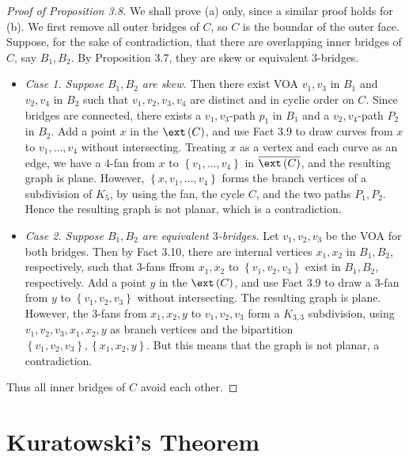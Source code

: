 \documentclass[co342]{subfiles}
\begin{document}
    \begin{proof}[Proof of Proposition 3.8]
        We shall prove (a) only, since a similar proof holds for (b). We first remove all outer bridges of $C$, so $C$ is the boundar of the outer face. Suppose, for the sake of contradiction, that there are overlapping inner bridges of $C$, say $B_1,B_2$. By Proposition 3.7, they are skew or equivalent $3$-bridges.
        \begin{itemize}
            \item \textit{Case 1. Suppose $B_1,B_2$ are skew.} Then there exist VOA $v_1,v_3$ in $B_1$ and $v_2,v_4$ in $B_2$ such that $v_1,v_2,v_3,v_4$ are distinct and in cyclic order on $C$. Since bridges are connected, there exists a $v_1,v_3$-path $p_1$ in $B_1$ and a $v_2,v_4$-path $P_2$ in $B_2$. Add a point $x$ in the $\ext\left( C \right)$, and use Fact 3.9 to draw curves from $x$ to $v_1,\ldots,v_4$ without intersecting. Treating $x$ as a vertex and each curve as an edge, we have a $4$-fan from $x$ to $\left\lbrace v_1,\ldots,v_4 \right\rbrace$ in $\overline{\ext\left( C \right)}$, and the resulting graph is plane. However, $\left\lbrace x,v_1,\ldots,v_4 \right\rbrace$ forms the branch vertices of a subdivision of $K_5$, by using the fan, the cycle $C$, and the two paths $P_1,P_2$. Hence the resulting graph is not planar, which is a contradiction. 
            \item \textit{Case 2. Suppose $B_1,B_2$ are equivalent $3$-bridges.} Let $v_1,v_2,v_3$ be the VOA for both bridges. Then by Fact 3.10, there are internal vertices $x_1,x_2$ in $B_1,B_2$, respectively, such that $3$-fans ffrom $x_1,x_2$ to $\left\lbrace v_1,v_2,v_3 \right\rbrace$ exist in $B_1,B_2$, respectively. Add a point $y$ in the $\ext\left( C \right)$, and use Fact 3.9 to draw a $3$-fan from $y$ to $\left\lbrace v_1,v_2,v_3 \right\rbrace$ without intersecting. The resulting graph is plane. However, the $3$-fans from $x_1,x_2,y$ to $v_1,v_2,v_3$ form a $K_{3,3}$ subdivision, using $v_1,v_2,v_3,x_1,x_2,y$ as branch vertices and the bipartition $\left\lbrace v_1,v_2,v_3 \right\rbrace, \left\lbrace x_1,x_2,y \right\rbrace$. But this means that the graph is not planar, a contradiction.
        \end{itemize} 
        Thus all inner bridges of $C$ avoid each other.
    \end{proof}

    \section{Kuratowski's Theorem}
\end{document}
